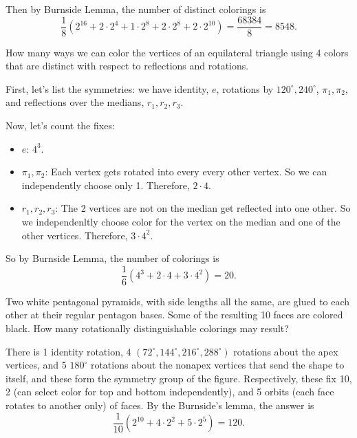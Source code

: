 \documentclass[11pt,twoside]{scrartcl}
\begin{document}
\begin{problem}
\begin{sketch}
\begin{itemize}
\begin{center}
\begin{asy}
                \end{asy}
            \end{center}
        \end{itemize}
        Then by Burnside Lemma, the number of distinct colorings is 
        \[\frac{1}{8}(2^{16} + 2\cdot 2^4 + 1 \cdot 2^8 + 2 \cdot 2^8 + 2 \cdot 2^{10}) = \frac{68384}{8} = \boxed{8548}.\]
    \end{sketch}
\end{problem}

\begin{problem}
    How many ways we can color the vertices of an equilateral triangle using 4 colors that are distinct with respect to reflections and rotations.
    \begin{sketch}
    First, let's list the symmetries: we have identity, $e$, rotations by $120^\circ, 240^\circ$, $\pi_1, \pi_2$, and reflections over the medians, $r_1, r_2, r_3$.
    
    Now, let's count the fixes:
    \begin{itemize}
        \item $e$: $4^3$.
        \item $\pi_1, \pi_2$: Each vertex gets rotated into every every other vertex. So we can independently choose only 1. Therefore, $2 \cdot 4$.
        \item $r_1, r_2, r_3$: The 2 vertices are not on the median get reflected into one other. So we independenltly choose color for the vertex on the median and one of the other vertices. Therefore, $3 \cdot 4^2$.
    \end{itemize}
    So by Burnside Lemma, the number of colorings is
    \[\frac{1}{6}(4^3 + 2 \cdot 4 + 3 \cdot 4^2) = \boxed{20} .\]
    \end{sketch}
\end{problem}
\begin{problem}
    Two white pentagonal pyramids, with side lengths all the same, are glued to each other
at their regular pentagon bases. Some of the resulting 10 faces are colored black. How many
rotationally distinguishable colorings may result?

\begin{sketch}
There is 1 identity rotation, 4
$(72^\circ, 144^\circ, 216^\circ, 288^\circ)$ rotations about the apex vertices, and 5 $180^\circ$
rotations about the nonapex vertices that send the shape to itself, and these form the symmetry group of the figure.
Respectively, these fix 10, 2 (can select color for top and bottom independently), and 5 orbits (each face rotates to another only) of faces. By the Burnside’s lemma, the answer
is 
\[ \frac{1}{10}(2^{10}+4\cdot2^2+5\cdot2^5)  = \boxed{120} .\]

\end{sketch}
\end{problem}
\end{document}
